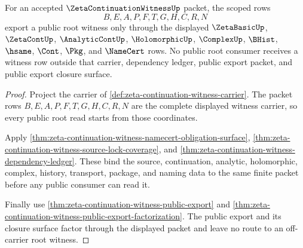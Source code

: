 \begin{theorem}
\label{thm:zeta-continuation-witness-public-root-export}
For an accepted $\ZetaContinuationWitnessUp$ packet, the scoped rows
$$
B,E,A,P,F,T,G,H,C,R,N
$$
export a public root witness only through the displayed $\ZetaBasicUp$, $\ZetaContUp$, $\AnalyticContUp$, $\HolomorphicUp$, $\ComplexUp$, $\BHist$, $\hsame$, $\Cont$, $\Pkg$, and $\NameCert$ rows. No public root consumer receives a witness row outside that carrier, dependency ledger, public export packet, and public export closure surface.
\end{theorem}
\begin{proof}
Project the carrier of \autoref{def:zeta-continuation-witness-carrier}. The packet rows $B,E,A,P,F,T,G,H,C,R,N$ are the complete displayed witness carrier, so every public root read starts from those coordinates.

Apply \autoref{thm:zeta-continuation-witness-namecert-obligation-surface}, \autoref{thm:zeta-continuation-witness-source-lock-coverage}, and \autoref{thm:zeta-continuation-witness-dependency-ledger}. These bind the source, continuation, analytic, holomorphic, complex, history, transport, package, and naming data to the same finite packet before any public consumer can read it.

Finally use \autoref{thm:zeta-continuation-witness-public-export} and \autoref{thm:zeta-continuation-witness-public-export-factorization}. The public export and its closure surface factor through the displayed packet and leave no route to an off-carrier root witness.
\end{proof}

